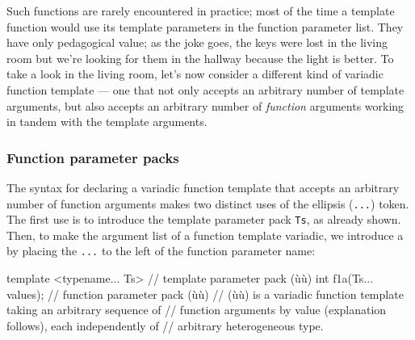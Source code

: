 Such functions are rarely encountered in practice; most of the time a
template function would use its template parameters in the function
parameter list. They have only pedagogical value; as the joke goes, the
keys were lost in the living room but we're looking for them in the
hallway because the light is better. To take a look in the living room,
let's now consider a different kind of variadic function template ---
one that not only accepts an arbitrary number of template arguments, but
also accepts an arbitrary number of \emph{function} arguments working in
tandem with the template arguments.

\subsubsection[Function parameter packs]{Function parameter packs}\label{function-parameter-packs}

The syntax for declaring a variadic function template that accepts an
arbitrary number of function arguments makes two distinct uses of the
ellipsis (\lstinline!...!) token. The first use is to introduce the
template parameter pack \lstinline!Ts!, as already shown. Then, to make the
argument list of a function template variadic, we introduce a
 by placing the \lstinline!...! to the left
of the function parameter name:

\begin{emcppslisting}
template <typename... Ts>  // template parameter pack (ù{}ù)
int f1a(Ts... values);     // function parameter pack (ù{}ù)
   // (ù{}ù) is a variadic function template taking an arbitrary sequence of
   // function arguments by value (explanation follows), each independently of
   // arbitrary heterogeneous type.
\end{emcppslisting}
    

